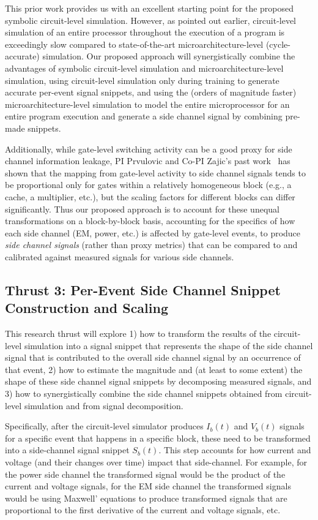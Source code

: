 This prior work provides us with an excellent starting point for the proposed symbolic circuit-level simulation. However, as pointed out earlier, circuit-level simulation of an entire processor throughout the execution of a program is exceedingly slow compared to state-of-the-art microarchitecture-level (cycle-accurate) simulation. Our proposed approach will synergistically combine the advantages of symbolic circuit-level simulation and microarchitecture-level simulation, using circuit-level simulation only during training to generate accurate per-event signal snippets, and using the (orders of magnitude faster) microarchitecture-level simulation to model the entire microprocessor for an entire program execution and generate a side channel signal by combining pre-made snippets.

Additionally, while gate-level switching activity can be a good proxy for side channel information leakage, PI Prvulovic and Co-PI Zajic's past work~\cite{Nader2020} has shown that the mapping from gate-level activity to side channel signals tends to be proportional only for gates within a relatively homogeneous block (e.g., a cache, a multiplier, etc.), but the scaling factors for different blocks can differ significantly. Thus our proposed approach is to account for these unequal transformations on a block-by-block basis, accounting for the specifics of how each side channel (EM, power, etc.) is affected by gate-level events, to produce {\em side channel signals} (rather than proxy metrics) that can be compared to and calibrated against measured signals for various side channels.

\subsection{Thrust 3: Per-Event Side Channel Snippet Construction and Scaling}
\label{sec:proposed-transform}

This research thrust will explore 1) how to transform the results of the circuit-level simulation into a signal snippet that represents the shape of the side channel signal that is contributed to the overall side channel signal by an occurrence of that event, 2) how to estimate the magnitude and (at least to some extent) the shape of these side channel signal snippets by decomposing measured signals, and 3) how to synergistically combine the side channel snippets obtained from circuit-level simulation and from signal decomposition.

Specifically, after the circuit-level simulator produces $I_b(t)$ and $V_b(t)$ signals for a specific event that happens in a specific block, these need to be transformed into a side-channel signal snippet $S_b(t)$. This step accounts for how current and voltage (and their changes over time) impact that side-channel. For example, for the power side channel the transformed signal would be the product of the current and voltage signals, for the EM side channel the transformed signals would be using Maxwell' equations to produce transformed signals that are proportional to the first derivative of the current and voltage signals, etc.

